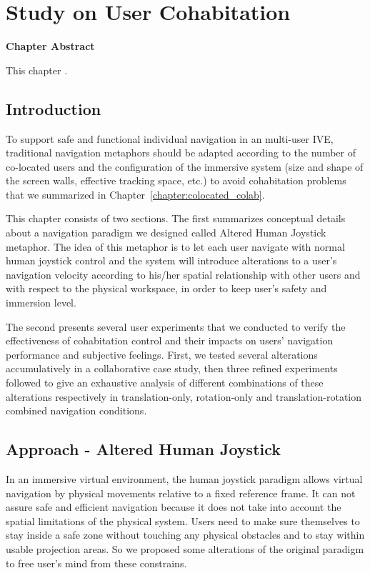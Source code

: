 \chapter{Study on User Cohabitation}
\label{chapter:user_cohab}
\pagebreak

\textbf{Chapter Abstract}

This chapter .

\vspace*{2\baselineskip}

\minitoc

\newpage
\section{Introduction}
To support safe and functional individual navigation in an multi-user IVE, traditional navigation metaphors should be adapted according to the number of co-located users and the configuration of the immersive system (size and shape of the screen walls, effective tracking space, etc.) to avoid cohabitation problems that we summarized in Chapter~\ref{chapter:colocated_colab}.

This chapter consists of two sections. The first summarizes conceptual details about a navigation paradigm we designed called Altered Human Joystick metaphor. The idea of this metaphor is to let each user navigate with normal human joystick control and the system will introduce alterations to a user's navigation velocity according to his/her spatial relationship with other users and with respect to the physical workspace, in order to keep user's safety and immersion level.

The second presents several user experiments that we conducted to verify the effectiveness of cohabitation control and their impacts on users' navigation performance and subjective feelings. First, we tested several alterations accumulatively in a collaborative case study, then three refined experiments followed to give an exhaustive analysis of different combinations of these alterations respectively in translation-only, rotation-only and translation-rotation combined navigation conditions.


\section{Approach - Altered Human Joystick}
In an immersive virtual environment, the human joystick paradigm allows virtual navigation by physical movements relative to a fixed reference frame. It can not assure safe and efficient navigation because it does not take into account the spatial limitations of the physical system. Users need to make sure themselves to stay inside a safe zone without touching any physical obstacles and to stay within usable projection areas. So we proposed some alterations of the original paradigm to free user's mind from these constrains.

